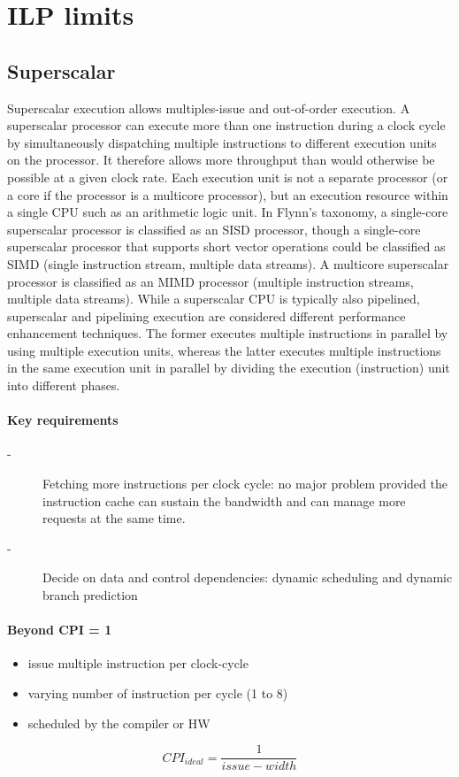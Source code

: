 \section{ILP limits}\label{sec:ilp-limits}
\subsection{Superscalar}\label{subsec:superscalar}
Superscalar execution allows multiples-issue and out-of-order execution.
A superscalar processor can execute more than one instruction during a clock cycle by simultaneously
dispatching multiple instructions to different execution units on the processor.
It therefore allows more throughput than would otherwise be possible at a given clock rate.
Each execution unit is not a separate processor (or a core if the processor is a multicore processor), but an
execution resource within a single CPU such as an arithmetic logic unit.
In Flynn's taxonomy, a single-core superscalar processor is classified as an SISD processor, though a single-core
superscalar processor that supports short vector operations could be classified as SIMD (single instruction stream,
multiple data streams).
A multicore superscalar processor is classified as an MIMD processor (multiple instruction streams, multiple data streams).
While a superscalar CPU is typically also pipelined, superscalar and pipelining execution are considered different
performance enhancement techniques.
The former executes multiple instructions in parallel by using multiple execution units, whereas the latter executes
multiple instructions in the same execution unit in parallel by dividing the execution (instruction) unit into
different phases.

\paragraph{Key requirements}
\begin{description}
    \item[-] Fetching more instructions per clock cycle: no major problem provided the instruction cache can sustain
    the bandwidth and can manage more requests at the same time.
    \item[-] Decide on data and control dependencies: dynamic scheduling and dynamic branch prediction
\end{description}

\paragraph{Beyond CPI = 1} 
\begin{itemize}[noitemsep]
    \item issue multiple instruction per clock-cycle
    \item varying number of instruction per cycle (1 to 8)
    \item scheduled by the compiler or HW
\end{itemize}
\[CPI_{ideal} =\frac{1}{issue-width}\]


